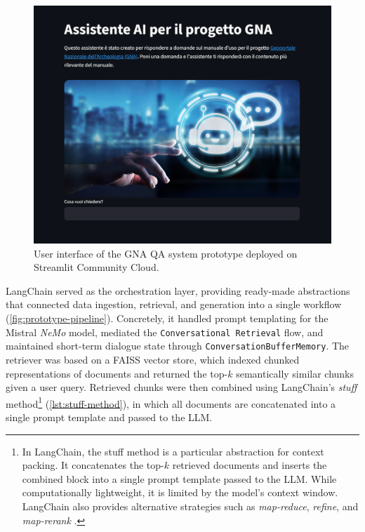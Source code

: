 \begin{spacing}{1.5}
\begin{figure}[H]
  \centering
  \includegraphics[width=\textwidth]{images/proto_UI.png} 
  \caption{User interface of the GNA QA system prototype deployed on Streamlit Community Cloud.}
  \label{fig:proto_UI}
\end{figure}

LangChain served as the orchestration layer, providing ready-made abstractions that connected data ingestion, retrieval, and generation into a single workflow (\autoref{fig:prototype-pipeline}). Concretely, it handled prompt templating for the Mistral \textit{NeMo} model, mediated the \texttt{Conversational Retrieval} flow, and maintained short-term dialogue state through \texttt{ConversationBufferMemory}. The retriever was based on a FAISS vector store, which indexed chunked representations of documents and returned the top-$k$ semantically similar chunks given a user query. Retrieved chunks were then combined using LangChain’s \textit{stuff} method\footnote{In LangChain, the stuff method is a particular abstraction for context packing. It concatenates the top-$k$ retrieved documents and inserts the combined block into a single prompt template passed to the LLM. While computationally lightweight, it is limited by the model’s context window. LangChain also provides alternative strategies such as \textit{map-reduce}, \textit{refine}, and \textit{map-rerank} \citep{topsakal_creating_2023}.} (\autoref{lst:stuff-method}), in which all documents are concatenated into a single prompt template and passed to the LLM.


\end{spacing}
